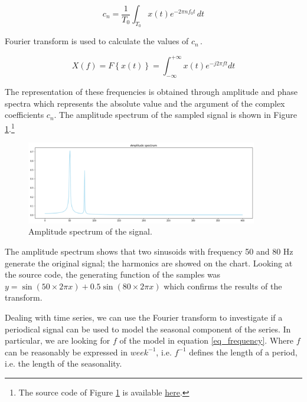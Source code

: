 \begin{equation}
c_n=\frac{1}{T_0}\int_{T_0}{x\left(t\right)e^{-2\pi n f_0t\ }dt}
\label{eq_FourierCoefficients}
\end{equation}

Fourier transform is used to calculate the values of $c_{n\ }$.

\begin{equation}
X\left(f\right)=F\left\{x\left(t\right)\right\}=\int_{-\infty}^{+\infty}{x\left(t\right)e^{-j2\pi ft}}dt
\label{eq_Fouriertransform}
\end{equation}

The representation of these frequencies is obtained through amplitude and phase spectra which represents the absolute value and the argument of the complex coefficients $c_n$. The amplitude spectrum of the sampled signal is shown in Figure \ref{fig_Fourier}.\footnote{The source code of Figure \ref{fig_Fourier} is available \href{https://github.com/aletuf93/logproj/blob/master/examples/03.\%20Statistics.ipynb}{here}.}

\begin{figure}[hbt!]
\centering
\includegraphics[width=0.9\textwidth]{SectionLetsMath/elemStat_figures/fig_Fourier.png}
\captionsetup{type=figure}
\caption{Amplitude spectrum of the signal.}
\label{fig_Fourier}
\end{figure}

The amplitude spectrum shows that two sinusoids with frequency 50 and 80 Hz generate the original signal; the harmonics are showed on the chart. Looking at the source code, the generating function of the samples was $y=\sin{\left(50 \times 2\pi x\right)}+0.5\sin(80\times2\pi x)$ which confirms the results of the transform.\par

Dealing with time series, we can use the Fourier transform to investigate if a periodical signal can be used to model the seasonal component of the series. In particular, we are looking for $f$ of the model in equation \ref{eq_frequency}. Where $f$ can be reasonably be expressed in $week^{-1}$, i.e. $f^{-1}$ defines the length of a period, i.e. the length of the seasonality.\par

